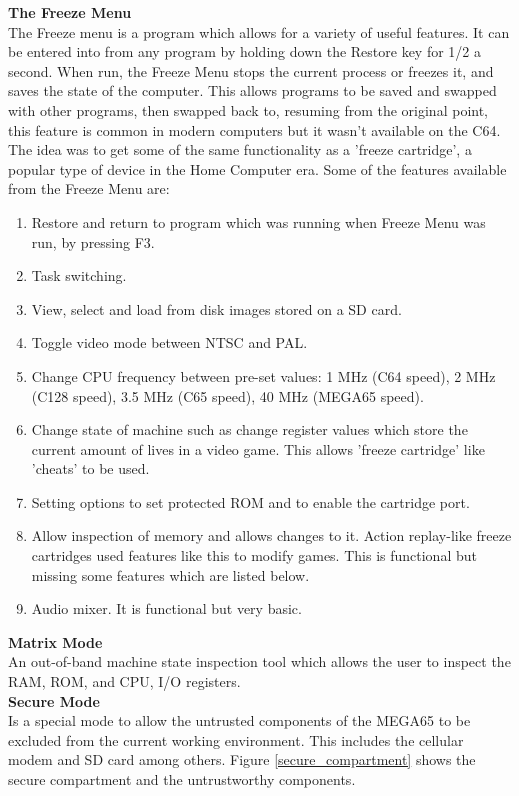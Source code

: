\textbf{The Freeze Menu}\\
The Freeze menu is a program which allows for a variety of useful features. It can be entered into from any program by holding down the Restore key for 1/2 a second. When run, the Freeze Menu stops the current process or freezes it, and saves the state of the computer. This allows programs to be saved and swapped with other programs, then swapped back to, resuming from the original point, this feature is common in modern computers but it wasn't available on the C64. The idea was to get some of the same functionality as a 'freeze cartridge', a popular type of device in the Home Computer era. Some of the features available from the Freeze Menu are:
\begin{enumerate}
\item Restore and return to program which was running when Freeze Menu was run, by pressing F3.
\item Task switching.
\item View, select and load from disk images stored on a SD card.
\item Toggle video mode between NTSC and PAL.
\item Change CPU frequency between pre-set values: 1 MHz (C64 speed), 2 MHz (C128 speed), 3.5 MHz (C65 speed), 40 MHz (MEGA65 speed).
\item Change state of machine such as change register values which store the current amount of lives in a video game. This allows 'freeze cartridge' like 'cheats' to be used.
\item Setting options to set protected ROM and to enable the cartridge port.
\item Allow inspection of memory and allows changes to it. Action replay-like freeze cartridges used features like this to modify games. This is functional but missing some features which are listed below.
\item Audio mixer. It is functional but very basic.
\end{enumerate}

\textbf{Matrix Mode}\\
An out-of-band machine state inspection tool which allows the user to inspect the RAM, ROM, and CPU, I/O registers.\\

\textbf{Secure Mode}\\
Is a special mode to allow the untrusted components of the MEGA65 to be excluded from the current working environment. This includes the cellular modem and SD card among others. Figure \ref{secure_compartment} shows the secure compartment and the untrustworthy components.\\


